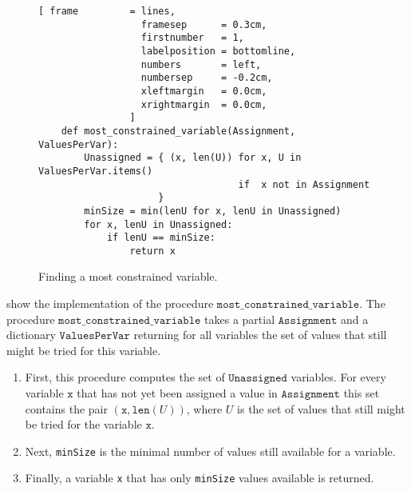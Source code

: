 \begin{figure}[!ht]
\centering
\begin{Verbatim}[ frame         = lines, 
                  framesep      = 0.3cm, 
                  firstnumber   = 1,
                  labelposition = bottomline,
                  numbers       = left,
                  numbersep     = -0.2cm,
                  xleftmargin   = 0.0cm,
                  xrightmargin  = 0.0cm,
                ]
    def most_constrained_variable(Assignment, ValuesPerVar):
        Unassigned = { (x, len(U)) for x, U in ValuesPerVar.items()
                                   if  x not in Assignment
                     }
        minSize = min(lenU for x, lenU in Unassigned)
        for x, lenU in Unassigned:
            if lenU == minSize:
                return x
\end{Verbatim}
\vspace*{-0.3cm}
\caption{Finding a most constrained variable.}
\label{fig:Constraint-Propagation-Solver.ipynb:most_constrained_variable}
\end{figure}
 show the implementation of the procedure
$\texttt{most\_constrained\_variable}$.  The procedure $\texttt{most\_constrained\_variable}$ takes a partial 
$\texttt{Assignment}$ and a dictionary $\texttt{ValuesPerVar}$ returning for all variables the set of values
that still might be tried for this variable.
\begin{enumerate}
\item First, this procedure computes the set of $\texttt{Unassigned}$ variables.  For every variable $\texttt{x}$ that
      has not yet been assigned a value in $\texttt{Assignment}$ this set contains the pair 
      $(\texttt{x}, \mathtt{len}(U))$, where $U$ is the set of values that still might be tried for the variable  $\texttt{x}$.
\item Next, \texttt{minSize} is the minimal number of values still available for a variable.
\item Finally, a variable \texttt{x} that has only \texttt{minSize} values available is returned.
\end{enumerate}

